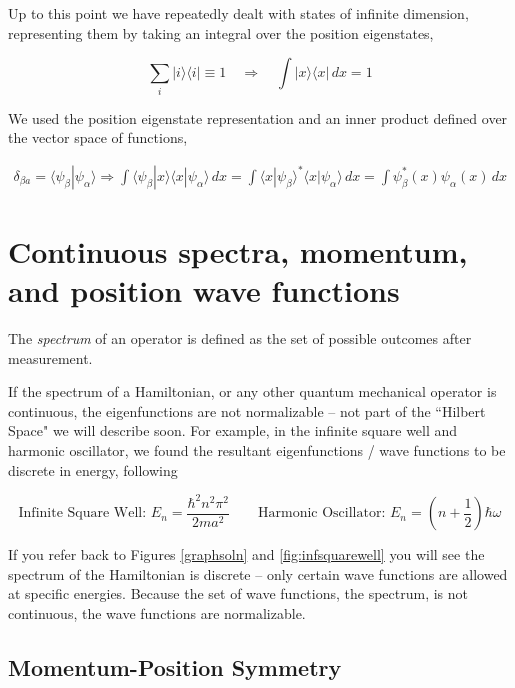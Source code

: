 Up to this point we have repeatedly dealt with states of infinite dimension,
representing them by taking an integral over the position eigenstates, 

\[
\sum_{i}^{} |i\rangle \langle i | \equiv 1 \quad \Rightarrow \quad \int
|x\rangle \langle x | \, dx = 1
\] \vspace{3px}

We used the position eigenstate representation and an inner
product defined over the vector space of functions, 

\begin{align*}
  \delta_{\beta a} = \langle \psi_\beta | \psi_\alpha \rangle \Rightarrow \int
  \langle \psi_\beta | x \rangle \langle x | \psi_\alpha \rangle \, dx = \int
  \langle x|\psi_\beta\rangle^* \langle x | \psi_\alpha \rangle \, dx = \int
  \psi_\beta^* (x) \psi_\alpha (x) \, dx 
\end{align*} \vspace{3px}


\section{Continuous spectra, momentum, and position wave functions}

The \textit{spectrum} of an operator is defined as the set of possible outcomes
after measurement. 

If the spectrum of a Hamiltonian, or any other quantum mechanical operator is
continuous, the eigenfunctions are not normalizable -- not part of the
``Hilbert Space" we will describe soon. For example, in the infinite square
well and harmonic oscillator, we found the resultant eigenfunctions / wave
functions to be discrete in energy, following 

\[
\text{Infinite Square Well: } E_n = \frac{\hbar^2n^2\pi^2}{2ma^2} \qquad
\text{Harmonic Oscillator: } E_n = \left( n + \frac{1}{2} \right) \hbar\omega   
\] \vspace{3px}

If you refer back to Figures \ref{graphsoln} and \ref{fig:infsquarewell} you
will see the spectrum of the Hamiltonian is discrete -- only certain wave
functions are allowed at specific energies. Because the set of wave functions,
the spectrum, is not continuous, the wave functions are normalizable. 

\subsection{Momentum-Position Symmetry} 

